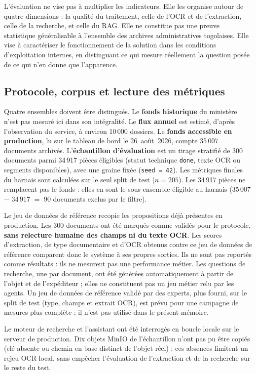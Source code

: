 L'évaluation ne vise pas à multiplier les indicateurs. Elle les organise autour de quatre dimensions : la qualité du traitement, celle de l'OCR et de l'extraction, celle de la recherche, et celle du RAG. Elle ne constitue pas une preuve statistique généralisable à l'ensemble des archives administratives togolaises. Elle vise à caractériser le fonctionnement de la solution dans les conditions d'exploitation internes, en distinguant ce qui mesure réellement la question posée de ce qui n'en donne que l'apparence.

\subsection{Protocole, corpus et lecture des métriques}

Quatre ensembles doivent être distingués. Le \textbf{fonds historique} du ministère n'est pas mesuré ici dans son intégralité. Le \textbf{flux annuel} est estimé, d'après l'observation du service, à environ 10\,000 dossiers. Le \textbf{fonds accessible en production}, lu sur le tableau de bord le 26~août~2026, compte 35\,007 documents archivés. L'\textbf{échantillon d'évaluation} est un tirage stratifié de 300 documents parmi 34\,917 pièces éligibles (statut technique \texttt{done}, texte OCR ou segments disponibles), avec une graine fixée (\texttt{seed = 42}). Les métriques finales du harnais sont calculées sur le seul split de test ($n = 205$). Les 34\,917 pièces ne remplacent pas le fonds : elles en sont le sous-ensemble éligible au harnais (35\,007 $-$ 34\,917 $=$ 90 documents exclus par le filtre).

Le jeu de données de référence recopie les propositions déjà présentes en production. Les 300 documents ont été marqués comme validés pour le protocole, \textbf{sans relecture humaine des champs ni du texte OCR}. Les scores d'extraction, de type documentaire et d'OCR obtenus contre ce jeu de données de référence comparent donc le système à ses propres sorties. Ils ne sont pas reportés comme résultats : ils ne mesurent pas une performance métier. Les questions de recherche, une par document, ont été générées automatiquement à partir de l'objet et de l'expéditeur ; elles ne constituent pas un jeu métier relu par les agents. Un jeu de données de référence validé par des experts, plus fourni, sur le split de test (type, champs et extrait OCR), est prévu pour une campagne de mesures plus complète ; il n'est pas utilisé dans le présent mémoire.

Le moteur de recherche et l'assistant ont été interrogés en boucle locale sur le serveur de production. Dix objets MinIO de l'échantillon n'ont pas pu être copiés (clé absente ou chemin en base distinct de l'objet réel) ; ces absences limitent un rejeu OCR local, sans empêcher l'évaluation de l'extraction et de la recherche sur le reste du test.

